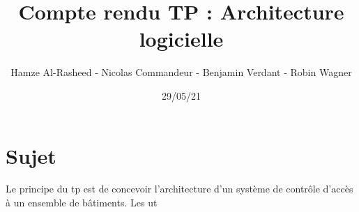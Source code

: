 \documentclass[a4paper,10pt]{article}
\title{Compte rendu TP : Architecture logicielle}
\date{29/05/21}
\author{Hamze Al-Rasheed - Nicolas Commandeur - Benjamin Verdant - Robin Wagner}
\begin{document}
    \maketitle
    \newpage
    \tableofcontents
    \newpage
    
    \section{Sujet}
        Le principe du tp est de concevoir l'architecture d'un système de contrôle d'accès à un ensemble de bâtiments.
        Les ut
\end{document}
